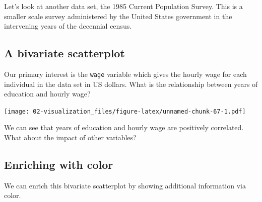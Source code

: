 \documentclass[
]{book}
\newenvironment{Shaded}{\begin{snugshade}}{\end{snugshade}}
\newcommand{\CommentTok}[1]{\textcolor[rgb]{0.56,0.35,0.01}{\textit{#1}}}
\newcommand{\DataTypeTok}[1]{\textcolor[rgb]{0.13,0.29,0.53}{#1}}
\newcommand{\KeywordTok}[1]{\textcolor[rgb]{0.13,0.29,0.53}{\textbf{#1}}}
\newcommand{\NormalTok}[1]{#1}
\newcommand{\OperatorTok}[1]{\textcolor[rgb]{0.81,0.36,0.00}{\textbf{#1}}}
\newcommand{\StringTok}[1]{\textcolor[rgb]{0.31,0.60,0.02}{#1}}
\begin{document}
Let's look at another data set, the 1985 Current Population Survey. This is a smaller scale survey administered by the United States government in the intervening years of the decennial census.

\hypertarget{a-bivariate-scatterplot}{%
\subsection{A bivariate scatterplot}\label{a-bivariate-scatterplot}}

Our primary interest is the \texttt{wage} variable which gives the hourly wage for each individual in the data set in US dollars. What is the relationship between years of education and hourly wage?

\begin{Shaded}
\end{Shaded}

\texttt{[image: 02-visualization\_files/figure-latex/unnamed-chunk-67-1.pdf]}

We can see that years of education and hourly wage are positively correlated. What about the impact of other variables?

\hypertarget{enriching-with-color}{%
\subsection{Enriching with color}\label{enriching-with-color}}

We can enrich this bivariate scatterplot by showing additional information via color.

\begin{Shaded}
\end{Shaded}
\end{document}
